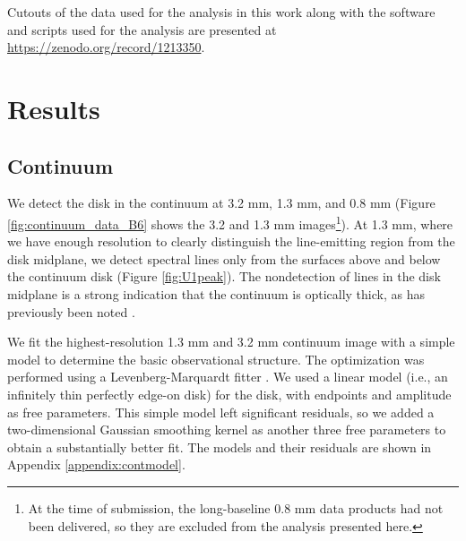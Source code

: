\documentclass[twocolumn]{aastex61}
\def\ee#1{\ensuremath{\times10^{#1}}}
\newcommand{\perbeam}{\ensuremath{\textrm{beam}^{-1}}\xspace}
\def\FigureTwo#1#2#3#4#5#6{
\begin{figure}[!htp]
\subfigure[]{ \texttt{[image: \#1]} }
\subfigure[]{ \texttt{[image: \#2]} }
\caption{#3}
\label{#4}
\end{figure}
}
\begin{document}
Cutouts of the data used for the analysis in this work along with the software and scripts
used for the analysis are presented at \url{https://zenodo.org/record/1213350}.

\section{Results}
\label{sec:results}

\subsection{Continuum}
We detect the disk in the continuum at 3.2 mm, 1.3 mm, and 0.8 mm (Figure
\ref{fig:continuum_data_B6} shows the 3.2 and 1.3 mm images\footnote{At the
time of submission, the long-baseline 0.8 mm data products had not been
delivered, so they are excluded from the analysis presented here.}).  At 1.3
mm, where we have enough resolution to clearly distinguish the line-emitting
region from the disk midplane, we detect spectral lines only from the surfaces
above and below the continuum disk (Figure \ref{fig:U1peak}).  The nondetection
of lines in the disk midplane is a strong indication that the continuum is
optically thick, as has previously been noted \citep[e.g.,][]{Plambeck2016a}.


We fit the highest-resolution 1.3 mm and 3.2 mm continuum image with a simple
model to determine the basic
observational structure.
The optimization was performed using a Levenberg-Marquardt
fitter \citep{Newville2014a}. 
We used a linear model (i.e., an infinitely thin
perfectly edge-on disk) for the disk, with endpoints and amplitude as free parameters.
This simple model left significant residuals, so we added a two-dimensional
Gaussian smoothing kernel as another three free parameters to obtain a
substantially better fit.
The models and their residuals
are shown in Appendix \ref{appendix:contmodel}.
\end{document}

